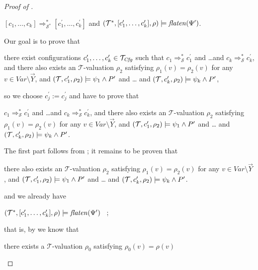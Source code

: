 \begin{proof}[Proof of ]
\begin{enumerate}
    \begin{proofenv}
        $[c_1,\ldots,c_k] \Rightarrow_{\mathcal{S}^*}^* [c^\prime_1,\ldots,c^\prime_k]$
        and $(\mathcal{T}^*, [c^\prime_1,\ldots,c^\prime_k], \rho) \models \mathit{flaten}(\Psi^\prime)$.
    \end{proofenv}
    Our goal is to prove that
    \begin{proofenv}
        there exist configurations $c_1^\prime,\ldots,c_k^\prime \in \mathcal{T}_{\mathit{Cfg}}$
        such that $c_1 \Rightarrow^{*}_{\mathcal{S}} c_1^\prime$
        and \ldots and $c_k \Rightarrow^{*}_{\mathcal{S}} c_k^\prime$,
        and there also exists an $\mathcal{T}$-valuation $\rho_2$
        satisfying $\rho_1(v) = \rho_2(v)$ for any $v \in \mathit{Var} \setminus \vec{Y}$,
        and
        $(\mathcal{T}, c_1^\prime,\rho_2) \models \psi_1 \land P^\prime$ and \ldots
        and $(\mathcal{T}, c_k^\prime, \rho_2) \models \psi_k \land P^\prime$,
    \end{proofenv}
    so we choose $c^\prime_j := c^\prime_j$ and have to prove that
    \begin{proofenv}
        $c_1 \Rightarrow^{*}_{\mathcal{S}} c_1^\prime$
        and \ldots and $c_k \Rightarrow^{*}_{\mathcal{S}} c_k^\prime$,
        and there also exists an $\mathcal{T}$-valuation $\rho_2$
        satisfying $\rho_1(v) = \rho_2(v)$ for any $v \in \mathit{Var} \setminus \vec{Y}$,
        and
        $(\mathcal{T}, c_1^\prime,\rho_2) \models \psi_1 \land P^\prime$ and \ldots
        and $(\mathcal{T}, c_k^\prime, \rho_2) \models \psi_k \land P^\prime$.
    \end{proofenv}
    The first part follows from ;
    it remains to be proven that
    \begin{proofenv}
        there also exists an $\mathcal{T}$-valuation $\rho_2$
        satisfying $\rho_1(v) = \rho_2(v)$ for any $v \in \mathit{Var} \setminus \vec{Y}$,
        and
        $(\mathcal{T}, c_1^\prime,\rho_2) \models \psi_1 \land P^\prime$ and \ldots
        and $(\mathcal{T}, c_k^\prime, \rho_2) \models \psi_k \land P^\prime$.
    \end{proofenv}
    and we already have
    \begin{proofenv}
        $(\mathcal{T}^*, [c^\prime_1,\ldots,c^\prime_k], \rho) \models \mathit{flaten}(\Psi^\prime)$ \, ;
    \end{proofenv}
    that is, by  we know that
    \begin{proofenv}
        there exists a $\mathcal{T}$-valuation $\rho_0$ satisfying $\rho_0(v) = \rho(v)$

\end{proofenv}
\end{enumerate}
\end{proof}

